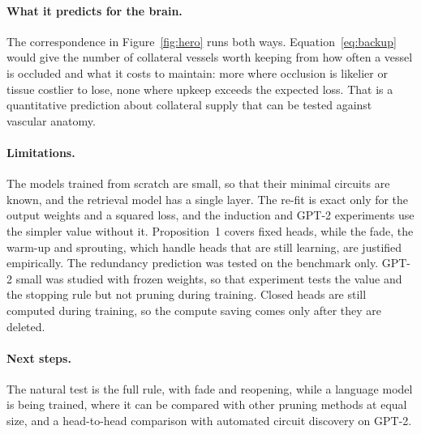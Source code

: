 \documentclass[letterpaper]{article} %
\begin{document}
\paragraph{What it predicts for the brain.} The correspondence in Figure~\ref{fig:hero} runs both ways. Equation~\eqref{eq:backup} would give the number of collateral vessels worth keeping from how often a vessel is occluded and what it costs to maintain: more where occlusion is likelier or tissue costlier to lose, none where upkeep exceeds the expected loss. That is a quantitative prediction about collateral supply that can be tested against vascular anatomy.

\paragraph{Limitations.} The models trained from scratch are small, so that their minimal circuits are known, and the retrieval model has a single layer. The re-fit is exact only for the output weights and a squared loss, and the induction and GPT-2 experiments use the simpler value without it. Proposition~1 covers fixed heads, while the fade, the warm-up and sprouting, which handle heads that are still learning, are justified empirically. The redundancy prediction was tested on the benchmark only. GPT-2 small was studied with frozen weights, so that experiment tests the value and the stopping rule but not pruning during training. Closed heads are still computed during training, so the compute saving comes only after they are deleted.

\paragraph{Next steps.} The natural test is the full rule, with fade and reopening, while a language model is being trained, where it can be compared with other pruning methods at equal size, and a head-to-head comparison with automated circuit discovery on GPT-2.


\end{document}

